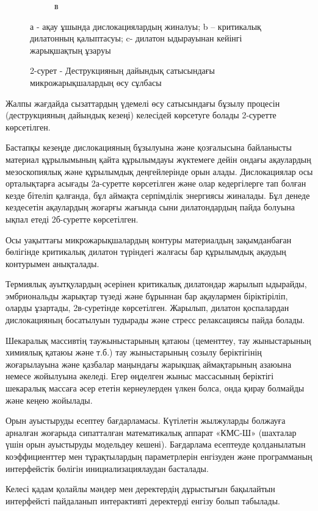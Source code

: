 \begin{figure}[H]
\begin{subfigure}[b]{0.22\textwidth}
		\caption*{в}
    \end{subfigure}
  \caption*{а - ақау ұшында дислокациялардың жиналуы; b -- критикалық дилатонның қалыптасуы; c- дилатон ыдырауынан кейінгі жарықшақтың ұзаруы}
  \caption*{2-сурет - Деструкцияның дайындық сатысындағы микрожарықшалардың өсу сұлбасы}
\end{figure}

\begin{multicols}{2}
Жалпы жағдайда сызаттардың үдемелі өсу сатысындағы бұзылу процесін
(деструкцияның дайындық кезеңі) келесідей көрсетуге болады 2-суретте
көрсетілген.

Бастапқы кезеңде дислокацияның бұзылуына және қозғалысына байланысты
материал құрылымының қайта құрылымдауы жүктемеге дейін ондағы ақаулардың
мезоскопиялық және құрылымдық деңгейлерінде орын алады. Дислокациялар
осы орталықтарға асығады 2а-суретте көрсетілген және олар кедергілерге
тап болған кезде бітеліп қалғанда, бұл аймақта серпімділік энергиясы
жиналады. Бұл денеде кездесетін ақаулардың жоғарғы жағында сыни
дилатондардың пайда болуына ықпал етеді 2б-суретте көрсетілген.

Осы уақыттағы микрожарықшалардың контуры материалдың зақымданбаған
бөлігінде критикалық дилатон түріндегі жалғасы бар құрылымдық ақаудың
контурымен анықталады.

Термиялық ауытқулардың әсерінен критикалық дилатондар жарылып ыдырайды,
эмбриональды жарықтар түзеді және бұрыннан бар ақаулармен біріктіріліп,
оларды ұзартады, 2в-суретінде көрсетілген. Жарылып, дилатон қоспалардан
дислокацияның босатылуын тудырады және стресс релаксациясы пайда болады.

Шекаралық массивтің таужыныстарының қатаюы (цементтеу, тау жыныстарының
химиялық қатаюы және т.б.) тау жыныстарының созылу беріктігінің
жоғарылауына және қазбалар маңындағы жарықшақ аймақтарының азаюына
немесе жойылуына әкеледі. Егер өңделген жыныс массасының беріктігі
шекаралық массаға әсер ететін кернеулерден үлкен болса, онда қирау
болмайды және кеңею жойылады.

Орын ауыстыруды есептеу бағдарламасы. Күтілетін жылжуларды болжауға
арналған жоғарыда сипатталған математикалық аппарат «КМС-Ш» (шахталар
үшін орын ауыстыруды модельдеу кешені). Бағдарлама есептеуде
қолданылатын коэффициенттер мен тұрақтылардың параметрлерін енгізуден
және программаның интерфейстік бөлігін инициализациялаудан басталады.

Келесі қадам қолайлы мәндер мен деректердің дұрыстығын бақылайтын
интерфейсті пайдаланып интерактивті деректерді енгізу болып табылады.


\end{multicols}
